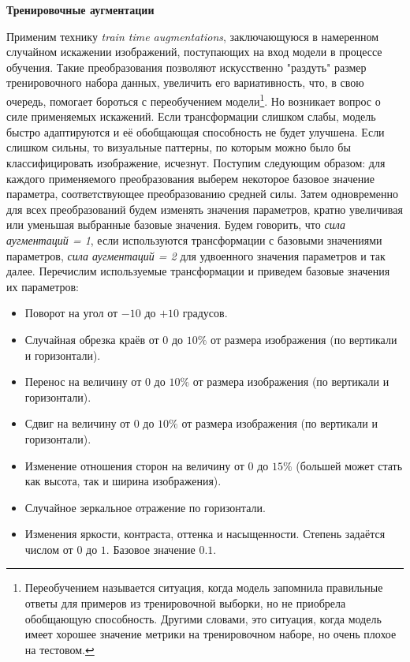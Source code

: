     
\indent
\textbf{Тренировочные аугментации}

\indent
Применим технику \textit{train time augmentations}, заключающуюся
в намеренном случайном искажении изображений, поступающих на вход модели 
в процессе обучения. Такие преобразования позволяют искусственно
"раздуть" размер тренировочного набора данных, увеличить его 
вариативность, что, в свою очередь, помогает бороться с переобучением
модели\footnote{Переобучением называется ситуация, когда модель
запомнила правильные ответы для примеров из тренировочной выборки,
но не приобрела обобщающую способность. Другими словами, это ситуация,
когда модель имеет хорошее значение метрики на тренировочном наборе,
но очень плохое на тестовом.}.
Но возникает вопрос о силе применяемых искажений.
Если трансформации слишком слабы, модель быстро адаптируются и её обобщающая 
способность не будет улучшена. Если слишком сильны, то визуальные паттерны, по
которым можно было бы классифицировать изображение, исчезнут.
Поступим следующим образом:
для каждого применяемого преобразования выберем некоторое базовое значение 
параметра, соответствующее преобразованию средней силы. 
Затем одновременно для всех преобразований будем изменять значения параметров,
кратно увеличивая или уменьшая выбранные базовые значения.
Будем говорить, что \textit{сила аугментаций = 1}, если используются трансформации 
с базовыми значениями параметров, \textit{сила аугментаций = 2} для удвоенного 
значения параметров и так далее. Перечислим используемые трансформации
и приведем базовые значения их параметров:

\begin{itemize}

    \item Поворот на угол от $-10$ до $+10$ градусов.

    \item Случайная обрезка краёв от $0$ до $10\%$ от размера изображения 
    (по вертикали и горизонтали).    
    
    \item Перенос на величину от $0$ до $10\%$ от размера изображения
    (по вертикали и горизонтали).
    
    \item Сдвиг на величину от $0$ до $10\%$ от размера изображения
    (по вертикали и горизонтали).
    
    \item Изменение отношения сторон на величину от $0$ до $15\%$
    (большей может стать как высота, так и ширина изображения).
    
    \item Случайное зеркальное отражение по горизонтали.
    
    \item Изменения яркости, контраста, оттенка и насыщенности.
    Степень задаётся числом от $0$ до $1$. Базовое значение $0.1$.
    
\end{itemize}
    
